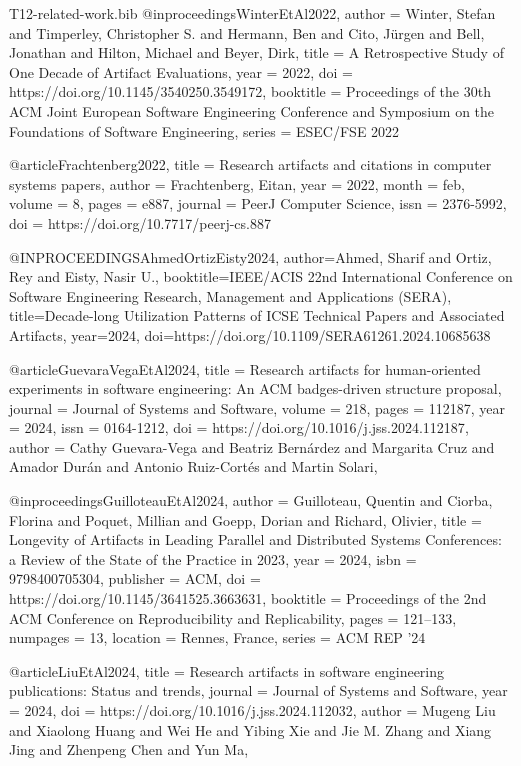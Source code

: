 \begin{filecontents}{T12-related-work.bib}
@inproceedings{WinterEtAl2022,
    author = {Winter, Stefan and Timperley, Christopher S. and Hermann, Ben and Cito, J\"{u}rgen and Bell, Jonathan and Hilton, Michael and Beyer, Dirk},
    title = {{A Retrospective Study of One Decade of Artifact Evaluations}},
    year = {2022},
    doi = {https://doi.org/10.1145/3540250.3549172},
    booktitle = {Proceedings of the 30th ACM Joint European Software Engineering Conference and Symposium on the Foundations of Software Engineering},
    series = {ESEC/FSE 2022}
}

@article{Frachtenberg2022,
     title = {Research artifacts and citations in computer systems papers},
     author = {Frachtenberg, Eitan},
     year = 2022,
     month = feb,
     volume = 8,
     pages = {e887},
     journal = {PeerJ Computer Science},
     issn = {2376-5992},
     doi = {https://doi.org/10.7717/peerj-cs.887}   
}

@INPROCEEDINGS{AhmedOrtizEisty2024,
  author={Ahmed, Sharif and Ortiz, Rey and Eisty, Nasir U.},
  booktitle={IEEE/ACIS 22nd International Conference on Software Engineering Research, Management and Applications (SERA)}, 
  title={{Decade-long Utilization Patterns of ICSE Technical Papers and Associated Artifacts}}, 
  year={2024},
  doi={https://doi.org/10.1109/SERA61261.2024.10685638}
}

@article{GuevaraVegaEtAl2024,
title = {{Research artifacts for human-oriented experiments in software engineering: An ACM badges-driven structure proposal}},
journal = {Journal of Systems and Software},
volume = {218},
pages = {112187},
year = {2024},
issn = {0164-1212},
doi = {https://doi.org/10.1016/j.jss.2024.112187},
author = {Cathy Guevara-Vega and Beatriz Bernárdez and Margarita Cruz and Amador Durán and Antonio Ruiz-Cortés and Martin Solari},
}

@inproceedings{GuilloteauEtAl2024,
author = {Guilloteau, Quentin and Ciorba, Florina and Poquet, Millian and Goepp, Dorian and Richard, Olivier},
title = {{Longevity of Artifacts in Leading Parallel and Distributed Systems Conferences: a Review of the State of the Practice in 2023}},
year = {2024},
isbn = {9798400705304},
publisher = {ACM},
doi = {https://doi.org/10.1145/3641525.3663631},
booktitle = {Proceedings of the 2nd ACM Conference on Reproducibility and Replicability},
pages = {121–133},
numpages = {13},
location = {Rennes, France},
series = {ACM REP '24}
}

@article{LiuEtAl2024,
title = {Research artifacts in software engineering publications: Status and trends},
journal = {Journal of Systems and Software},
year = {2024},
doi = {https://doi.org/10.1016/j.jss.2024.112032},
author = {Mugeng Liu and Xiaolong Huang and Wei He and Yibing Xie and Jie M. Zhang and Xiang Jing and Zhenpeng Chen and Yun Ma},
}
\end{filecontents}

